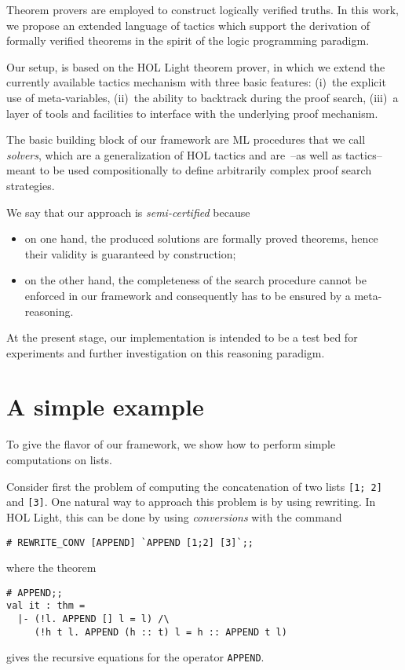 Theorem provers are employed to construct logically verified truths.
In this work, we propose an extended language of tactics which support
the derivation of formally verified theorems in the spirit of the
logic programming paradigm.

Our setup, is based on the HOL Light theorem prover, in which we
extend the currently available tactics mechanism with three basic
features: (i)~the explicit use of meta-variables, (ii)~the ability to
backtrack during the proof search, (iii)~a layer of tools and
facilities to interface with the underlying proof mechanism.

The basic building block of our framework are ML procedures that we
call \emph{solvers}, which are a generalization of HOL tactics and
are~--as well as tactics-- meant to be used compositionally to define
arbitrarily complex proof search strategies.

We say that our approach is \emph{semi-certified} because
\begin{itemize}
\item on one hand, the produced solutions are formally proved
  theorems, hence their validity is guaranteed by construction;
\item on the other hand, the completeness of the search procedure
  cannot be enforced in our framework and consequently has to be
  ensured by a meta-reasoning.
\end{itemize}

At the present stage, our implementation \citep{Maggesi:Nocentini:kanrenlight}
is intended to be a test bed for experiments and further investigation on this
reasoning paradigm.


\section{A simple example}
\label{sec:an-simple-example}

To give the flavor of our framework, we show how to perform simple
computations on lists.

Consider first the problem of computing the concatenation of two lists
\verb|[1; 2]| and \verb|[3]|.  One natural way to approach this
problem is by using rewriting.  In HOL Light, this can be done by using
\emph{conversions} with the command
\begin{verbatim}
# REWRITE_CONV [APPEND] `APPEND [1;2] [3]`;;
\end{verbatim}
where the theorem
\begin{verbatim}
# APPEND;;
val it : thm =
  |- (!l. APPEND [] l = l) /\
     (!h t l. APPEND (h :: t) l = h :: APPEND t l)
\end{verbatim}
gives the recursive equations for the operator \verb|APPEND|.

